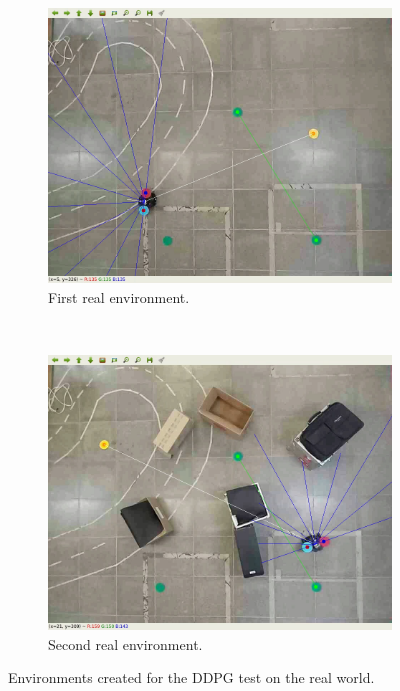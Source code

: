 \begin{figure}[H]
    \centering
    \begin{subfigure}[b]{0.4\textwidth}
        \includegraphics[width=\textwidth]{images/real_env1.png}
        \caption{First real environment.}
        \label{subfig:real_env1}
    \end{subfigure}
    ~ %
    \begin{subfigure}[b]{0.4\textwidth}
        \includegraphics[width=\textwidth]{images/real_env2.png}
        \caption{Second real environment.}
        \label{subfig:real_env2}
    \end{subfigure}
    \caption{Environments created for the DDPG test on the real world.}\label{fig:real_environments}
\end{figure}

